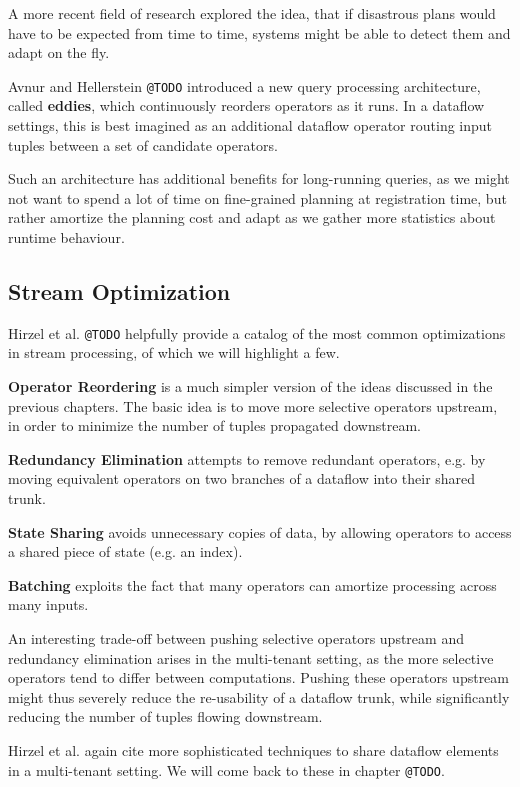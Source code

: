 \documentclass[../index.tex]{subfiles}
\begin{document}
A more recent field of research explored the idea, that if disastrous
plans would have to be expected from time to time, systems might be
able to detect them and adapt on the fly.

Avnur and Hellerstein \texttt{@TODO} introduced a new query processing
architecture, called \textbf{eddies}, which continuously reorders operators
as it runs. In a dataflow settings, this is best imagined as an
additional dataflow operator routing input tuples between a set of
candidate operators.

Such an architecture has additional benefits for long-running queries,
as we might not want to spend a lot of time on fine-grained planning
at registration time, but rather amortize the planning cost and adapt
as we gather more statistics about runtime behaviour.

\subsection{Stream Optimization}

Hirzel et al. \texttt{@TODO} helpfully provide a catalog of the most common
optimizations in stream processing, of which we will highlight a few.

\textbf{\textbf{Operator Reordering}} is a much simpler version of the ideas
discussed in the previous chapters. The basic idea is to move more
selective operators upstream, in order to minimize the number of
tuples propagated downstream.

\textbf{\textbf{Redundancy Elimination}} attempts to remove redundant operators,
e.g. by moving equivalent operators on two branches of a dataflow into
their shared trunk.

\textbf{\textbf{State Sharing}} avoids unnecessary copies of data, by allowing
operators to access a shared piece of state (e.g. an index).

\textbf{\textbf{Batching}} exploits the fact that many operators can amortize
processing across many inputs.

An interesting trade-off between pushing selective operators upstream
and redundancy elimination arises in the multi-tenant setting, as the
more selective operators tend to differ between computations. Pushing
these operators upstream might thus severely reduce the re-usability
of a dataflow trunk, while significantly reducing the number of tuples
flowing downstream. 

Hirzel et al. again cite more sophisticated techniques to share
dataflow elements in a multi-tenant setting. We will come back to
these in chapter \texttt{@TODO}.
\end{document}
